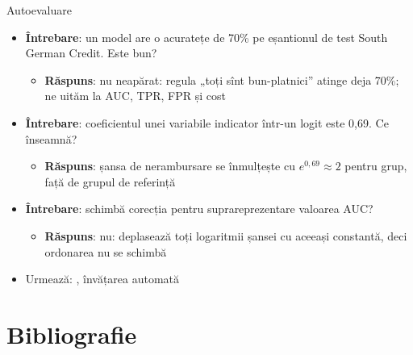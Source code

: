 \begin{frame}{Autoevaluare}
\itemsize{\small}
\begin{itemize}
    \item \textbf{Întrebare}: un model are o acuratețe de 70\% pe eșantionul de test South German Credit. Este bun?
    \begin{itemize}
        \item \textbf{Răspuns}: nu neapărat: regula „toți sînt bun-platnici” atinge deja 70\%; ne uităm la AUC, TPR, FPR și cost
    \end{itemize}
    \item \textbf{Întrebare}: coeficientul unei variabile indicator într-un logit este 0,69. Ce înseamnă?
    \begin{itemize}
        \item \textbf{Răspuns}: șansa de nerambursare se înmulțește cu $e^{0{,}69} \approx 2$ pentru grup, față de grupul de referință
    \end{itemize}
    \item \textbf{Întrebare}: schimbă corecția pentru suprareprezentare valoarea AUC?
    \begin{itemize}
        \item \textbf{Răspuns}: nu: deplasează toți logaritmii șansei cu aceeași constantă, deci ordonarea nu se schimbă
    \end{itemize}
    \item Urmează: , învățarea automată
\end{itemize}
\end{frame}


\section{Bibliografie}

